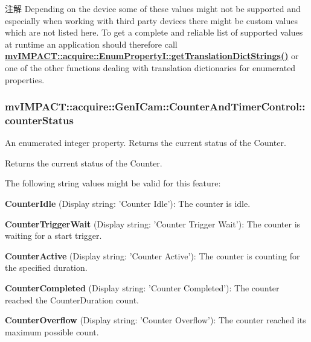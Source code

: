 \begin{DoxyNote}{注解}
Depending on the device some of these values might not be supported and especially when working with third party devices there might be custom values which are not listed here. To get a complete and reliable list of supported values at runtime an application should therefore call {\bfseries \hyperlink{classmv_i_m_p_a_c_t_1_1acquire_1_1_enum_property_i_a0ba6ccbf5ee69784d5d0b537924d26b6}{mv\+I\+M\+P\+A\+C\+T\+::acquire\+::\+Enum\+Property\+I\+::get\+Translation\+Dict\+Strings()}} or one of the other functions dealing with translation dictionaries for enumerated properties. 
\end{DoxyNote}
\hypertarget{classmv_i_m_p_a_c_t_1_1acquire_1_1_gen_i_cam_1_1_counter_and_timer_control_a45615d283c7dff07df8e05fc4679ad40}{
\subsubsection[{counter\+Status}]{ mv\+I\+M\+P\+A\+C\+T\+::acquire\+::\+Gen\+I\+Cam\+::\+Counter\+And\+Timer\+Control\+::counter\+Status}}\label{classmv_i_m_p_a_c_t_1_1acquire_1_1_gen_i_cam_1_1_counter_and_timer_control_a45615d283c7dff07df8e05fc4679ad40}


An enumerated integer property. Returns the current status of the Counter. 

Returns the current status of the Counter.

The following string values might be valid for this feature\+:
\begin{DoxyItemize}
\item {\bfseries Counter\+Idle} (Display string\+: 'Counter Idle')\+: The counter is idle.
\item {\bfseries Counter\+Trigger\+Wait} (Display string\+: 'Counter Trigger Wait')\+: The counter is waiting for a start trigger.
\item {\bfseries Counter\+Active} (Display string\+: 'Counter Active')\+: The counter is counting for the specified duration.
\item {\bfseries Counter\+Completed} (Display string\+: 'Counter Completed')\+: The counter reached the Counter\+Duration count.
\item {\bfseries Counter\+Overflow} (Display string\+: 'Counter Overflow')\+: The counter reached its maximum possible count.
\end{DoxyItemize}

